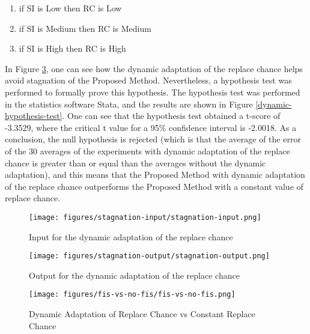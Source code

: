\documentclass[12pt,journal,draftcls,onecolumn]{IEEEtran}
\begin{document}
\begin{enumerate}
\item if SI is Low then RC is Low
\item if SI is Medium then RC is Medium
\item if SI is High then RC is High
\end{enumerate}

In Figure \ref{with-vs-without-dynamic}, one can see how the dynamic
adaptation of the replace chance helps avoid stagnation of the
Proposed Method. Nevertheless, a hypothesis test was performed to
formally prove this hypothesis. The hypothesis test was performed in
the statistics software Stata, and the results are shown in Figure
\ref{dynamic-hypothesis-test}. One can see that the hypothesis test
obtained a t-score of -3.3529, where the critical t value for a 95\%
confidence interval is -2.0018. As a conclusion, the null hypothesis
is rejected (which is that the average of the error of the 30 averages
of the experiments with dynamic adaptation of the replace chance is
greater than or equal than the averages without the dynamic
adaptation), and this means that the Proposed Method with dynamic
adaptation of the replace chance outperforms the Proposed Method with
a constant value of replace chance.

\begin{figure}[htp]
\caption{Input for the dynamic adaptation of the replace chance}
\label{dynamic-adaptation-input}
\begin{center}
\texttt{[image: figures/stagnation-input/stagnation-input.png]}
\end{center}
\end{figure}

\begin{figure}[htp]
\caption{Output for the dynamic adaptation of the replace chance}
\label{dynamic-adaptation-output}
\begin{center}
\texttt{[image: figures/stagnation-output/stagnation-output.png]}
\end{center}
\end{figure}

\begin{figure}[htp]
\caption{Dynamic Adaptation of Replace Chance vs Constant Replace
  Chance}
\label{with-vs-without-dynamic}
\begin{center}
\texttt{[image: figures/fis-vs-no-fis/fis-vs-no-fis.png]}
\end{center}
\end{figure}
\end{document}
